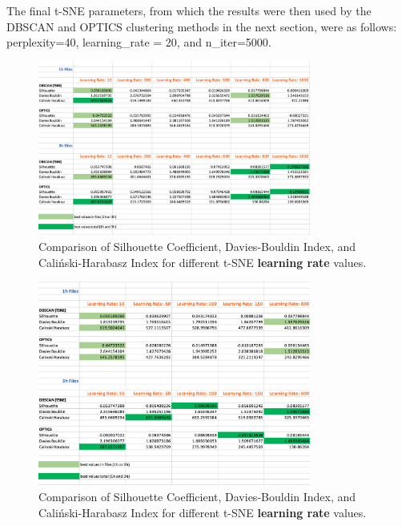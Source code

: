 
The final t-SNE parameters, from which the results were then used by the DBSCAN and OPTICS clustering methods in the next section, were as follows: perplexity=40, learning\_rate = 20, and n\_iter=5000.


\begin{figure}
  \centering
  \includegraphics[width=0.8\textwidth]{./images/tsneParametersTest/learningRate/learningRateEvaluationScores.png}
  \caption{Comparison of Silhouette Coefficient, Davies-Bouldin Index, and Caliński-Harabasz Index for different t-SNE \textbf{learning rate} values.}
  \label{figure:learningRateEvaluationScores}
\end{figure}

\begin{figure}
  \centering
  \includegraphics[width=0.8\textwidth]{./images/tsneParametersTest/learningRate/learningRateEvaluationScoresDetailed.png}
  \caption{Comparison of Silhouette Coefficient, Davies-Bouldin Index, and Caliński-Harabasz Index for different t-SNE \textbf{learning rate} values.}
  \label{figure:learningRateEvaluationScoresDetailed}
\end{figure}


